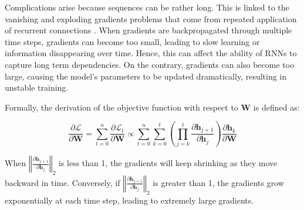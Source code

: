 
Complications arise because sequences can be rather long. This is linked to the vanishing and exploding gradients problems that come from repeated application of recurrent connections \citep{hochreiter2001gradient}. When gradients are backpropagated through multiple time steps, gradients can become too small, leading to slow learning or information disappearing over time. Hence, this can affect the ability of \acp{RNN} to capture long term dependencies. On the contrary, gradients can also become too large, causing the model's parameters to be updated dramatically, resulting in unstable training. 

Formally, the derivation of the objective function with respect to $\bm{W}$ is defined as:

\begin{equation}
    \frac{\partial \mathcal{L}}{\partial \bm{W}} = \sum_{t=0}^{n} \frac{\partial \mathcal{L}_t}{\partial \bm{W}} \propto \sum_{t=0}^{n} \sum_{k=0}^{t} \left( \prod_{j = k} ^{t} \frac{\partial \bm{h}_{j+1}}{\partial \bm{h}_{j}} \right) \frac{\partial \bm{h}_{k}}{\partial \bm{W}}
\end{equation}


When $\left\Vert \frac{\partial \bm{h}_{j+1}}{\partial \bm{h}_{j}} \right\Vert_2$ is less than 1, the gradients will keep shrinking as they move backward in time. Conversely, if $\left\Vert \frac{\partial \bm{h}_{j+1}}{\partial \bm{h}_{j}} \right\Vert_2$ is greater than 1, the gradients grow exponentially at each time step, leading to extremely large gradients. 




